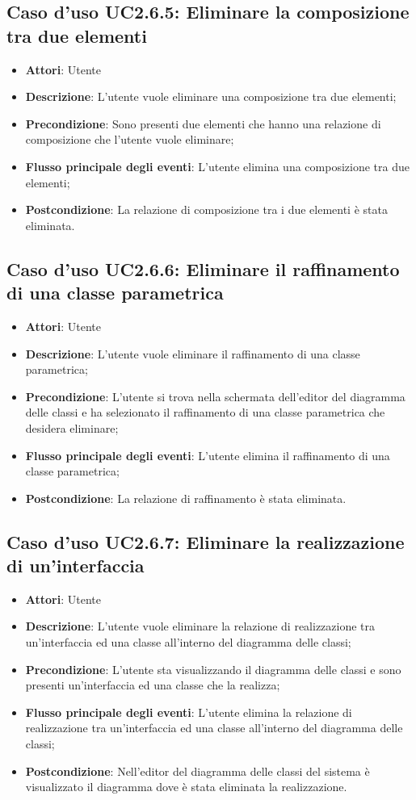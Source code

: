 \documentclass[../AnalisiDeiRequisiti.tex]{subfiles}
\begin{document}
		\subsection{Caso d'uso UC2.6.5: Eliminare la composizione tra due elementi}
		\begin{itemize}
			\item \textbf{Attori}: Utente
			\item \textbf{Descrizione}: L'utente vuole eliminare una composizione tra due elementi;
			\item \textbf{Precondizione}: Sono presenti due elementi che hanno una relazione di composizione che l'utente vuole eliminare;
			\item \textbf{Flusso principale degli eventi}: L'utente elimina una composizione tra due elementi;
			\item \textbf{Postcondizione}: La relazione di composizione tra i due elementi è stata eliminata.
		\end{itemize}
		\subsection{Caso d'uso UC2.6.6: Eliminare il raffinamento di una classe parametrica}
		\begin{itemize}
			\item \textbf{Attori}: Utente
			\item \textbf{Descrizione}: L'utente vuole eliminare il raffinamento di una classe parametrica;
			\item \textbf{Precondizione}: L'utente si trova nella schermata dell'editor del diagramma delle classi e ha selezionato il raffinamento di una classe parametrica che desidera eliminare;
			\item \textbf{Flusso principale degli eventi}: L'utente elimina il raffinamento di una classe parametrica;
			\item \textbf{Postcondizione}: La relazione di raffinamento è stata eliminata.
		\end{itemize}
		\subsection{Caso d'uso UC2.6.7: Eliminare la realizzazione di un'interfaccia}
		\begin{itemize}
			\item \textbf{Attori}: Utente
			\item \textbf{Descrizione}: L'utente vuole eliminare la relazione di realizzazione tra un'interfaccia ed una classe all'interno del diagramma delle classi;
			\item \textbf{Precondizione}: L'utente sta visualizzando il diagramma delle classi e sono presenti un'interfaccia ed una classe che la realizza;
			\item \textbf{Flusso principale degli eventi}: L'utente elimina la relazione di realizzazione tra un'interfaccia ed una classe all'interno del diagramma delle classi;
			\item \textbf{Postcondizione}: Nell'editor del diagramma delle classi del sistema è visualizzato il diagramma dove è stata eliminata la realizzazione.
		\end{itemize}
\end{document}

